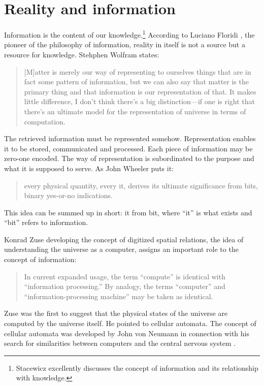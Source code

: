 \documentclass[pdftex,12pt]{article}
\begin{document}
\section{Reality and information} 
Information is the content of our knowledge.\footnote{Stacewicz \parencite*[\S 1. Różne wymiary informacji (Different dimensions of information)]{MarciszewskiStacewicz2011} excellently discusses the concept of information and its relationship with knowledge.}
According to Luciano Floridi \parencite*{Floridi2008}, the pioneer of the philosophy of information, reality in itself is not a source but a resource for knowledge.  Stehphen Wolfram \parencite*[p.389]{Wolfram2002} states: \begin{quote} \small [M]atter is merely our way of representing to ourselves things that are in fact some pattern of information, but we can also say that matter is the primary thing and that information is our representation of that. It makes little difference, I don’t think there’s a big distinction---if one is right that there’s an ultimate model for the representation of universe in terms of computation. \end{quote} The retrieved information must be represented somehow. Representation enables it to be stored, communicated and processed. Each piece of information may be zero-one encoded. The way of representation is subordinated to the purpose and what it is supposed to serve. As John Wheeler \parencite*{Wheeler1989} puts it: \begin{quote} \small every physical quantity, every it, derives its ultimate significance from bits, binary yes-or-no indications. \end{quote} This idea can be summed up in short: it from bit, where ``it'' is what exists and ``bit'' refers to information.

Konrad Zuse \parencite*[p.5]{Zuse2012a} developing the concept of digitized spatial relations, the idea of understanding the universe as a computer, assigns an important role to the concept of information: \begin{quote} \small In current expanded usage, the term ``compute'' is identical with ``information processing.'' By analogy, the terms ``computer'' and ``information-processing machine'' may be taken as identical. \end{quote} Zuse was the first to suggest that the physical states of the universe are computed by the universe itself. He pointed to cellular automata. The concept of cellular automata was developed by John von Neumann in connection with his search for similarities between computers and the central nervous system \parencite{vonNeumann1951,vonNeumann1958,vonNeumann2012, Neumann1966,Shannon1958}.
\end{document}
